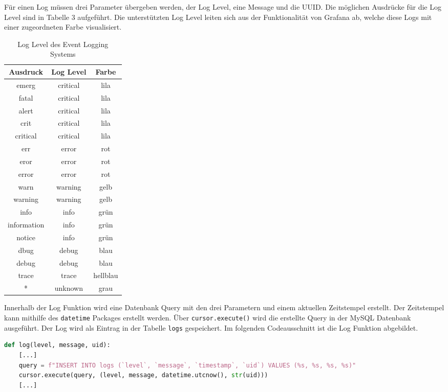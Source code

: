 Für einen Log müssen drei Parameter übergeben werden, der Log Level, eine Message und die UUID. Die möglichen Ausdrücke für die Log Level sind in Tabelle 3 aufgeführt. Die unterstützten Log Level leiten sich aus der Funktionalität von Grafana ab, welche diese Logs mit einer zugeordneten Farbe visualisiert.

\begin{table}[H]
\centering
\begin{tabular}{c|c|c}
\textbf{Ausdruck} & \textbf{Log Level} & \textbf{Farbe}\\
\hline
emerg & critical & lila\\
fatal & critical & lila\\
alert & critical & lila\\
crit & critical & lila\\
critical & critical & lila\\
err & error & rot\\
eror & error & rot\\
error & error & rot\\
warn & warning & gelb\\
warning & warning & gelb\\
info & info & grün\\
information & info & grün\\
notice & info & grün\\
dbug & debug & blau\\
debug & debug & blau\\
trace & trace & hellblau\\
* & unknown & grau
\end{tabular}
\caption{Log Level des Event Logging Systems}
\end{table}

Innerhalb der Log Funktion wird eine Datenbank Query mit den drei Parametern und einem aktuellen Zeitstempel erstellt. Der Zeitstempel kann mithilfe des \texttt{datetime} Packages erstellt werden. Über \texttt{cursor.execute()} wird die erstellte Query in der MySQL Datenbank ausgeführt. Der Log wird als Eintrag in der Tabelle \texttt{logs} gespeichert. Im folgenden Codeausschnitt ist die Log Funktion abgebildet.

\begin{lstlisting}[language=Python]
def log(level, message, uid):
    [...]
    query = f"INSERT INTO logs (`level`, `message`, `timestamp`, `uid`) VALUES (%s, %s, %s, %s)"
    cursor.execute(query, (level, message, datetime.utcnow(), str(uid)))
    [...]
\end{lstlisting}

